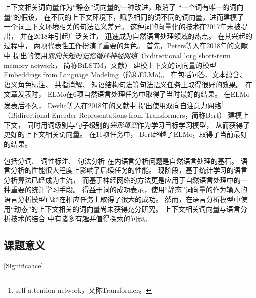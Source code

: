 上下文相关词向量\cite{NIPS2017_7209,melamud-goldberger-dagan:2016:CoNLL,peters-EtAl:2018:N18-1,DBLP:journals/corr/abs-1810-04805}作为“静态”词向量的一种改进，取消了
“一个词有唯一的词向量”的假设，
在不同的上下文环境下，赋予相同的词不同的词向量，进而建模了
一个词上下文环境相关的句法语义差异。
这种词的向量化的技术在2017年末被提出，
并在2018年引起广泛关注，
迅速成为自然语言处理领域的热点。
在其兴起的过程中，
两项代表性工作扮演了重要的角色。
首先，Peters等人在2018年的文献中
提出的使用\textit{双向长短时记忆循环神经网络}（bidirectional long short-term memory network，
简称BiLSTM，文献）
建模上下文的词向量的模型 --- Embeddings from Language Modeling（简称ELMo）。
在包括问答、文本蕴含、语义角色标注\cite{peters-EtAl:2018:N18-1}、
共指消解\cite{lee-he-zettlemoyer:2018:N18-2}、
短语结构句法\cite{joshi-peters-hopkins:2018:Long}等句法语义任务上取得很好的效果。
在文章发表时，
ELMo在6项自然语言处理任务中取得了当时最好的结果。
在ELMo发表后不久，
Devlin等人在2018年的文献中
提出使用双向自注意力网络\footnote{self-attention network，又称Transformer\cite{NIPS2017_7181}。}（Bidirectional Encoder Representations from Transformers，简称Bert）
建模上下文，
同时用词级别与句子级别的\textit{完形填空}作为学习目标学习模型，
从而获得了
更好的上下文相关词向量。
在11项任务中，
Bert超越了ELMo，取得了当前最好的结果。

包括分词\cite{Xue:2003:CWS:1119250.1119278,zhang-clark:2007:ACLMain,zheng-chen-xu:2013:EMNLP}、
词性标注\cite{DBLP:journals/corr/HuangXY15,ma-hovy:2016:P16-1}、
句法分析\cite{mcdonald2006online,nivre2008algorithms,zhang-clark:2008:ACLMain,chen-manning:2014:EMNLP2014,DBLP:journals/corr/DozatM16}
在内语言分析问题是自然语言处理的基石。
语言分析的性能很大程度上影响了后续任务的性能。
现阶段，基于统计学习的语言分析算法已经成为主流，
而基于神经网络的方法更是应用于自然语言处理中的一种重要的统计学习手段。
得益于词的成功表示，使用``静态''词向量的作为输入的
语言分析模型已经在相应任务上取得了很大的成功。\cite{zheng-chen-xu:2013:EMNLP,chen-manning:2014:EMNLP2014,DBLP:journals/corr/HuangXY15,ma-hovy:2016:P16-1,DBLP:journals/corr/DozatM16}
然而，在语言分析模型中使用``动态''的上下文相关的词向量尚未获得充分研究。
上下文相关词向量与语言分析技术的结合
中有诸多有趣并值得探索的问题。

\subsection{课题意义}[Significance]

